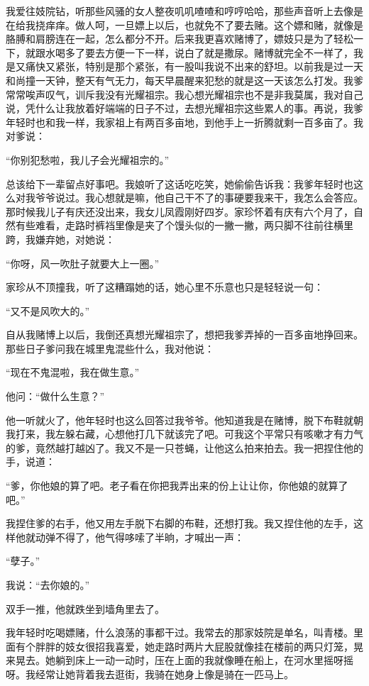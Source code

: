 \documentclass[12pt,UTF8]{ctexbook}
\begin{document}
我爱往妓院钻，听那些风骚的女人整夜叽叽喳喳和哼哼哈哈，那些声音听上去像是在给我挠痒痒。做人呵，一旦嫖上以后，也就免不了要去赌。这个嫖和赌，就像是胳膊和肩膀连在一起，怎么都分不开。后来我更喜欢赌博了，嫖妓只是为了轻松一下，就跟水喝多了要去方便一下一样，说白了就是撒尿。赌博就完全不一样了，我是又痛快又紧张，特别是那个紧张，有一股叫我说不出来的舒坦。以前我是过一天和尚撞一天钟，整天有气无力，每天早晨醒来犯愁的就是这一天该怎么打发。我爹常常唉声叹气，训斥我没有光耀祖宗。我心想光耀祖宗也不是非我莫属，我对自己说，凭什么让我放着好端端的日子不过，去想光耀祖宗这些累人的事。再说，我爹年轻时也和我一样，我家祖上有两百多亩地，到他手上一折腾就剩一百多亩了。我对爹说：

“你别犯愁啦，我儿子会光耀祖宗的。”

总该给下一辈留点好事吧。我娘听了这话吃吃笑，她偷偷告诉我：我爹年轻时也这么对我爷爷说过。我心想就是嘛，他自己干不了的事硬要我来干，我怎么会答应。那时候我儿子有庆还没出来，我女儿凤霞刚好四岁。家珍怀着有庆有六个月了，自然有些难看，走路时裤裆里像是夹了个馒头似的一撇一撇，两只脚不往前往横里跨，我嫌弃她，对她说：

“你呀，风一吹肚子就要大上一圈。”

家珍从不顶撞我，听了这糟蹋她的话，她心里不乐意也只是轻轻说一句：

“又不是风吹大的。”

自从我赌博上以后，我倒还真想光耀祖宗了，想把我爹弄掉的一百多亩地挣回来。那些日子爹问我在城里鬼混些什么，我对他说：

“现在不鬼混啦，我在做生意。”

他问：“做什么生意？”

他一听就火了，他年轻时也这么回答过我爷爷。他知道我是在赌博，脱下布鞋就朝我打来，我左躲右藏，心想他打几下就该完了吧。可我这个平常只有咳嗽才有力气的爹，竟然越打越凶了。我又不是一只苍蝇，让他这么拍来拍去。我一把捏住他的手，说道：

“爹，你他娘的算了吧。老子看在你把我弄出来的份上让让你，你他娘的就算了吧。”

我捏住爹的右手，他又用左手脱下右脚的布鞋，还想打我。我又捏住他的左手，这样他就动弹不得了，他气得哆嗦了半晌，才喊出一声：

“孽子。”

我说：“去你娘的。”

双手一推，他就跌坐到墙角里去了。

我年轻时吃喝嫖赌，什么浪荡的事都干过。我常去的那家妓院是单名，叫青楼。里面有个胖胖的妓女很招我喜爱，她走路时两片大屁股就像挂在楼前的两只灯笼，晃来晃去。她躺到床上一动一动时，压在上面的我就像睡在船上，在河水里摇呀摇呀。我经常让她背着我去逛街，我骑在她身上像是骑在一匹马上。
\end{document}
